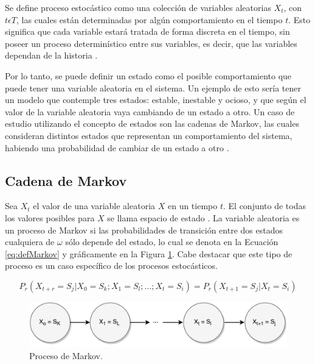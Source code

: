 Se define proceso estocástico como una colección de variables aleatorias {$X_t$, con $t \epsilon T$}, las cuales están determinadas por algún comportamiento en el tiempo $t$. Esto significa que cada variable estará tratada de forma discreta en el tiempo, sin poseer un proceso determinístico entre sus variables, es decir, que las variables dependan de la historia \citep{taylor2014introduction}.

Por lo tanto, se puede definir un estado como el posible comportamiento que puede tener una variable aleatoria en el sistema. %
Un ejemplo de esto sería tener un modelo que contemple tres estados: estable, inestable y ocioso, y que según el valor de la variable aleatoria vaya cambiando de un estado a otro. Un caso de estudio utilizando el concepto de estados son las cadenas de Markov, las cuales consideran distintos estados que representan un comportamiento del sistema, habiendo una probabilidad de cambiar de un estado a otro \citep{de1978calculus}.

\subsection{Cadena de Markov}
\label{subsec:cadenaMarkov}

Sea $X_t$ el valor de una variable aleatoria $X$ en un tiempo $t$. El conjunto de todas los valores posibles para $X$ se llama espacio de estado \citep{ching2006markov}. La variable aleatoria es un proceso de Markov si las probabilidades de transición entre dos estados cualquiera de $\omega$ sólo depende del estado, lo cual se denota en la Ecuación \ref{eq:defMarkov} y gráficamente en la Figura \ref{fig:procesoMarkov}. Cabe destacar que este tipo de proceso es un caso específico de los procesos estocásticos.

\begin{equation} \label{eq:defMarkov} 
	P_r(X_{t+r} = S_j | X_0 = S_k ; X_1 = S_l ; ... ; X_t = S_i) = P_r(X_{t+1} = S_j | X_t = S_i)
\end{equation}

\begin{figure}[ht!]
  \centering
    \includegraphics[scale=0.6]{images/ProcesoMarkov.pdf}
  \caption{Proceso de Markov.}
  \label{fig:procesoMarkov}
\end{figure}

